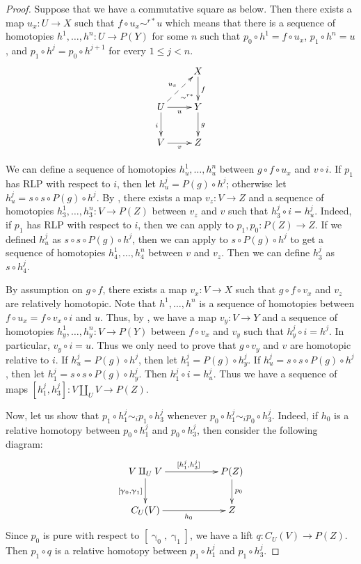 \documentclass{tac}
\theoremstyle{definition}
\newcommand{\cyli}{\upgamma}
\begin{document}
\begin{proof}
Suppose that we have a commutative square as below.
Then there exists a map $u_x : U \to X$ such that $f \circ u_x \sim^{r*} u$ which means that there is a sequence of homotopies $h^1, \ldots, h^n : U \to P(Y)$ for some $n$
such that $p_0 \circ h^1 = f \circ u_x$, $p_1 \circ h^n = u$, and $p_1 \circ h^j = p_0 \circ h^{j+1}$ for every $1 \leq j < n$.
\[ \xymatrix{   \ar@{}[dr]|(.7){\sim^{r*}}            & X \ar[d]^f \\
              U \ar@{-->}[ur]^{u_x} \ar[d]_i \ar[r]_u & Y \ar[d]^g \\
              V \ar[r]_v                              & Z
            } \]

We can define a sequence of homotopies $h^1_u, \ldots, h^n_u$ between $g \circ f \circ u_x$ and $v \circ i$.
If $p_1$ has RLP with respect to $i$, then let $h^j_u = P(g) \circ h^j$; otherwise let $h^j_u = s \circ s \circ P(g) \circ h^j$.
By , there exists a map $v_z : V \to Z$ and a sequence of homotopies $h^1_3, \ldots, h^n_3 : V \to P(Z)$ between $v_z$ and $v$ such that $h^j_3 \circ i = h^j_u$.
Indeed, if $p_1$ has RLP with respect to $i$, then we can apply  to $p_1,p_0 : P(Z) \to Z$.
If we defined $h^j_u$ as $s \circ s \circ P(g) \circ h^j$, then we can apply  to $s \circ P(g) \circ h^j$ to get a sequence of homotopies $h^1_4, \ldots, h^n_4$ between $v$ and $v_z$.
Then we can define $h^j_3$ as $s \circ h^j_4$.

By assumption on $g \circ f$, there exists a map $v_x : V \to X$ such that $g \circ f \circ v_x$ and $v_z$ are relatively homotopic.
Note that $h^1, \ldots, h^n$ is a sequence of homotopies between $f \circ u_x = f \circ v_x \circ i$ and $u$.
Thus, by , we have a map $v_y : V \to Y$ and a sequence of homotopies $h^1_y, \ldots, h^n_y : V \to P(Y)$ between $f \circ v_x$ and $v_y$ such that $h^j_y \circ i = h^j$.
In particular, $v_y \circ i = u$.
Thus we only need to prove that $g \circ v_y$ and $v$ are homotopic relative to $i$.
If $h^j_u = P(g) \circ h^j$, then let $h^j_1 = P(g) \circ h^j_y$.
If $h^j_u = s \circ s \circ P(g) \circ h^j$, then let $h^j_1 = s \circ s \circ P(g) \circ h^j_y$.
Then $h^j_1 \circ i = h^j_u$.
Thus we have a sequence of maps $[h^j_1,h^j_3] : V \amalg_U V \to P(Z)$.

Now, let us show that $p_1 \circ h^j_1 \sim_i p_1 \circ h^j_3$ whenever $p_0 \circ h^j_1 \sim_i p_0 \circ h^j_3$.
Indeed, if $h_0$ is a relative homotopy between $p_0 \circ h^j_1$ and $p_0 \circ h^j_3$, then consider the following diagram:
\[ \xymatrix{ V \amalg_U V \ar[rr]^{[h^j_1, h^j_3]} \ar[d]_{[\cyli_0,\cyli_1]} & & P(Z) \ar[d]^{p_0} \\
              C_U(V) \ar[rr]_{h_0} & & Z
            } \]
Since $p_0$ is pure with respect to $[\cyli_0,\cyli_1]$, we have a lift $q : C_U(V) \to P(Z)$.
Then $p_1 \circ q$ is a relative homotopy between $p_1 \circ h^j_1$ and $p_1 \circ h^j_3$.


\end{proof}
\end{document}
